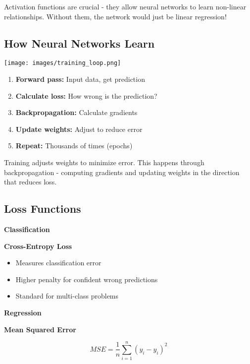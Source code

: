 \documentclass[
  letterpaper,
  DIV=11,
  numbers=noendperiod]{scrartcl}
\providecommand{\tightlist}{%
  \setlength{\itemsep}{0pt}\setlength{\parskip}{0pt}}
\begin{document}
Activation functions are crucial - they allow neural networks to learn
non-linear relationships. Without them, the network would just be linear
regression!

\subsection{How Neural Networks Learn}\label{how-neural-networks-learn}

\begin{center}
\texttt{[image: images/training\_loop.png]}
\end{center}

\begin{enumerate}
\def\labelenumi{\arabic{enumi}.}
\tightlist
\item
  \textbf{Forward pass:} Input data, get prediction
\item
  \textbf{Calculate loss:} How wrong is the prediction?
\item
  \textbf{Backpropagation:} Calculate gradients
\item
  \textbf{Update weights:} Adjust to reduce error
\item
  \textbf{Repeat:} Thousands of times (epochs)
\end{enumerate}

Training adjusts weights to minimize error. This happens through
backpropagation - computing gradients and updating weights in the
direction that reduces loss.

\subsection{Loss Functions}\label{loss-functions}

\textbf{Classification}

\textbf{Cross-Entropy Loss}

\begin{itemize}
\tightlist
\item
  Measures classification error
\item
  Higher penalty for confident wrong predictions
\item
  Standard for multi-class problems
\end{itemize}

\textbf{Regression}

\textbf{Mean Squared Error}

\[MSE = \frac{1}{n}\sum_{i=1}^{n}(y_i - \hat{y}_i)^2\]
\end{document}
